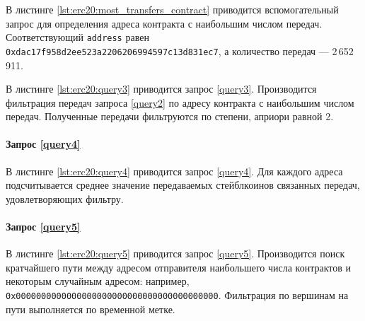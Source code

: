 В листинге \ref{lst:erc20:most_transfers_contract} приводится вспомогательный запрос для определения адреса контракта
с наибольшим числом передач. Соответствующий \texttt{address} равен \texttt{0xdac17f958d2ee523a2206206994597c13d831ec7}, а
количество передач --- 2\,652\,911.

В листинге \ref{lst:erc20:query3} приводится запрос \ref{query3}. Производится фильтрация передач запроса \ref{query2}
по адресу контракта с наибольшим числом передач. Полученные передачи фильтруются по степени, априори равной 2.

\paragraph{Запрос \ref{query4}}

В листинге \ref{lst:erc20:query4} приводится запрос \ref{query4}. Для каждого адреса подсчитывается среднее значение
передаваемых стейблкоинов связанных передач, удовлетворяющих фильтру.

\paragraph{Запрос \ref{query5}}

В листинге \ref{lst:erc20:query5} приводится запрос \ref{query5}. Производится поиск кратчайшего пути между адресом
отправителя наибольшего числа контрактов и некоторым случайным адресом: например,
\texttt{0x0000000000000000000000000000000000000000}. Фильтрация по вершинам на пути выполняется по временной метке.
